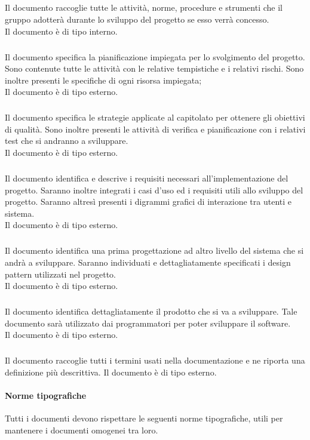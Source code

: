 				\subparagraph{\docNameNdP} Il documento raccoglie tutte le attività, norme, procedure e strumenti che il gruppo adotterà durante lo sviluppo del progetto se esso verrà concesso.\\
				Il documento è di tipo interno.
				
				\subparagraph{\docNamePdP} Il documento specifica la pianificazione impiegata per lo svolgimento del progetto. Sono contenute tutte le attività con le relative tempistiche e i relativi rischi. Sono inoltre presenti le specifiche di ogni risorsa impiegata;\\
				Il documento è di tipo esterno.

				\subparagraph{\docNamePdQ} Il documento specifica le strategie applicate al capitolato per ottenere gli obiettivi di qualità. Sono inoltre presenti le attività di verifica e pianificazione con i relativi test che si andranno a sviluppare. \\
				Il documento è di tipo esterno.

				\subparagraph{\docNameAdR} Il documento identifica e descrive i requisiti necessari all'implementazione del progetto. Saranno inoltre integrati i casi d'uso ed i requisiti utili allo sviluppo del progetto. Saranno altresì presenti i digrammi grafici di interazione tra utenti e sistema.\\
				Il documento è di tipo esterno.

				\subparagraph{\docNameST} Il documento identifica una prima progettazione ad altro livello del sistema che si andrà a sviluppare. Saranno individuati e dettagliatamente specificati i design pattern utilizzati nel progetto.\\
				Il documento è di tipo esterno.

				\subparagraph{\docNameDdP} Il documento identifica dettagliatamente il prodotto che si va a sviluppare. Tale documento sarà utilizzato dai programmatori per poter sviluppare il software.\\ 
				Il documento è di tipo esterno.

				\subparagraph{\docNameGlo} Il documento raccoglie tutti i termini usati nella documentazione e ne riporta una definizione più descrittiva.  
				Il documento è di tipo esterno.


			\paragraph{Norme tipografiche}
			Tutti i documenti devono rispettare le seguenti norme tipografiche, utili per mantenere i documenti omogenei tra loro.
				
